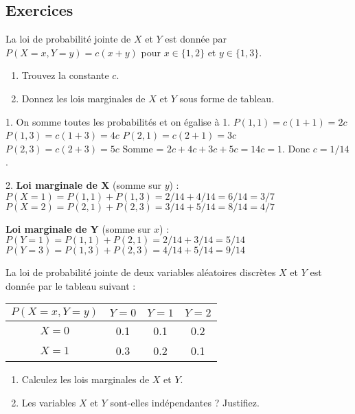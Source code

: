 \subsection{Exercices}

\begin{exercicebox}
La loi de probabilité jointe de $X$ et $Y$ est donnée par $P(X=x, Y=y) = c(x+y)$ pour $x \in \{1, 2\}$ et $y \in \{1, 3\}$.
\begin{enumerate}
    \item Trouvez la constante $c$.
    \item Donnez les lois marginales de $X$ et $Y$ sous forme de tableau.
\end{enumerate}
\end{exercicebox}

\begin{correctionbox}
1. On somme toutes les probabilités et on égalise à 1.
$P(1,1) = c(1+1) = 2c$
$P(1,3) = c(1+3) = 4c$
$P(2,1) = c(2+1) = 3c$
$P(2,3) = c(2+3) = 5c$
Somme = $2c + 4c + 3c + 5c = 14c = 1$. Donc $c = 1/14$.

2. \textbf{Loi marginale de X} (somme sur $y$) :
$P(X=1) = P(1,1) + P(1,3) = 2/14 + 4/14 = 6/14 = 3/7$
$P(X=2) = P(2,1) + P(2,3) = 3/14 + 5/14 = 8/14 = 4/7$

\textbf{Loi marginale de Y} (somme sur $x$) :
$P(Y=1) = P(1,1) + P(2,1) = 2/14 + 3/14 = 5/14$
$P(Y=3) = P(1,3) + P(2,3) = 4/14 + 5/14 = 9/14$
\end{correctionbox}

\begin{exercicebox}
La loi de probabilité jointe de deux variables aléatoires discrètes $X$ et $Y$ est donnée par le tableau suivant :

\begin{center}
\begin{tabular}{|c|c|c|c|}
\hline
$P(X=x, Y=y)$ & $Y=0$ & $Y=1$ & $Y=2$ \\
\hline
$X=0$ & 0.1 & 0.1 & 0.2 \\
\hline
$X=1$ & 0.3 & 0.2 & 0.1 \\
\hline
\end{tabular}
\end{center}

\begin{enumerate}
    \item Calculez les lois marginales de $X$ et $Y$.
    \item Les variables $X$ et $Y$ sont-elles indépendantes ? Justifiez.
\end{enumerate}
\end{exercicebox}

